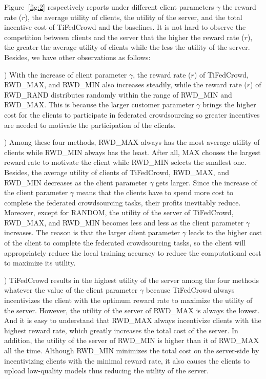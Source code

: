 \documentclass[final,1p,times]{elsarticle}
\begin{document}
Figure~\ref{fig:2} respectively reports under different client parameters $\gamma$ the reward rate ($r$), the average utility of clients, the utility of the server, and the total incentive cost of TiFedCrowd and the baselines. It is not hard to observe the competition between  clients and the server that the higher the reward rate ($r$), the greater the average utility of clients while the less the utility of the server. Besides, we have other observations as follows: 

\lowercase{}) With the increase of client parameter $\gamma$, the reward rate ($r$) of TiFedCrowd, RWD\_MAX, and RWD\_MIN also increases steadily, while the reward rate ($r$) of RWD\_RAND distributes randomly within the range of RWD\_MIN and RWD\_MAX. This is because the larger customer parameter $\gamma$ brings the higher cost for the clients to participate in federated crowdsourcing so greater incentives are needed to motivate the participation of the clients.

\lowercase{}) Among these four methods, RWD\_MAX always has the most average utility of clients while RWD\_MIN always has the least. After all, MAX chooses the largest reward rate to motivate the client while RWD\_MIN selects the smallest one. Besides, the average utility of clients of TiFedCrowd, RWD\_MAX, and RWD\_MIN decreases as the client parameter $\gamma$ gets larger. Since the increase of the client parameter $\gamma$ means that the clients have to spend more cost to complete the federated crowdsourcing tasks, their profits inevitably reduce. Moreover, except for RANDOM, the utility of the server of TiFedCrowd, RWD\_MAX, and RWD\_MIN becomes less and less as the client parameter $\gamma$ increases. The reason is that the larger client parameter $\gamma$ leads to the higher cost of the client to complete the federated crowdsourcing tasks, so the client will appropriately reduce the local training accuracy to reduce the computational cost to maximize its utility.

\lowercase{}) TiFedCrowd results in the highest utility of the server among the four methods whatever the value of the client parameter $\gamma$ because TiFedCrowd always incentivizes the client with the optimum reward rate to maximize the utility of the server. However, the utility of the server of RWD\_MAX is always the lowest. And it is easy to understand that RWD\_MAX always incentivize clients with the highest reward rate, which greatly increases the total cost of the server. In addition, the utility of the server of RWD\_MIN is higher than it of RWD\_MAX all the time. Although RWD\_MIN minimizes the total cost on the server-side by incentivizing clients with the minimal reward rate, it also causes the clients to upload low-quality models thus reducing the utility of the server. 
\end{document}
